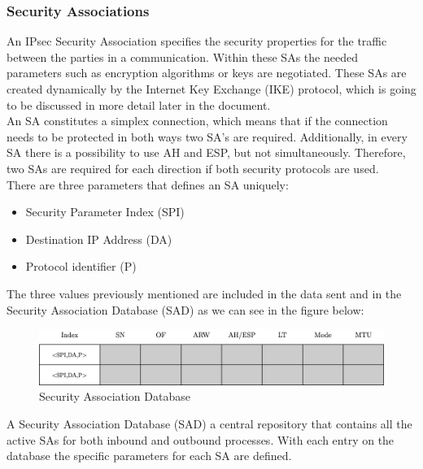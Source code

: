 \documentclass[11pt]{book}
\begin{document}
\subsubsection{ Security Associations}
An IPsec Security Association specifies the security properties for the traffic between the parties in a communication. Within these SAs the needed parameters such as encryption algorithms or keys are negotiated. These SAs are created dynamically by the Internet Key Exchange (IKE) protocol, which is going to be discussed in more detail later in the document.\\
An SA constitutes a simplex connection, which means that if the connection needs to be protected in both ways two SA's are required. Additionally, in every SA there is a possibility to use AH and ESP, but not simultaneously. Therefore, two SAs are required for each direction if both security protocols are used.\\
There are three parameters that defines an SA uniquely:
\begin{itemize}
\item Security Parameter Index (SPI)
\item Destination IP Address (DA)
\item Protocol identifier (P)
\end{itemize}
The three values previously mentioned are included in the data sent and in the Security Association Database (SAD) as we can see in the figure below:
\begin{figure}[H]
	\centering
	\includegraphics [scale=0.165] {sadb_table.png}
	\caption{Security Association Database}
\end{figure}
A Security Association Database (SAD) a central repository that contains all the active SAs for both inbound and outbound processes. With each entry on the database the specific parameters for each SA are defined.
\end{document}

